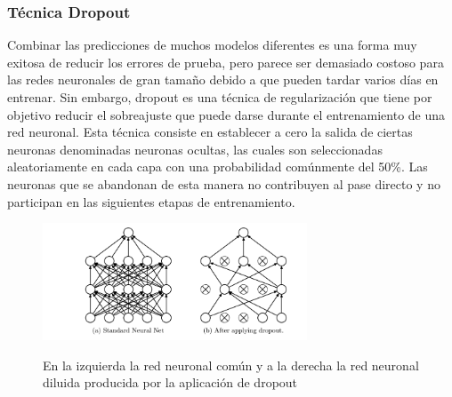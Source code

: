 		\vskip 0.4cm 
	\subsubsection {Técnica Dropout}
		
		Combinar las predicciones de muchos modelos diferentes es una forma muy exitosa de reducir los errores de prueba, pero parece ser demasiado costoso para las redes neuronales de gran tamaño debido a que pueden tardar varios días en entrenar. Sin embargo, dropout es una técnica de regularización que tiene por objetivo reducir el sobreajuste que puede darse durante el entrenamiento de una red neuronal. Esta técnica consiste en establecer a cero la salida de ciertas neuronas denominadas neuronas ocultas, las cuales son seleccionadas aleatoriamente en cada capa con una probabilidad comúnmente del 50\%. Las neuronas que se abandonan de esta manera no contribuyen al pase directo y no participan en las siguientes etapas de entrenamiento\citep{AulaDNN}.

		\begin{figure}[H]
		\begin{center}
		\includegraphics[width=0.7\textwidth]{images/marcoteorico/dropout_sample}
		\end{center}
		\begin{center}
		\caption{\small{En la izquierda la red neuronal común y a la derecha la red neuronal diluida producida por la aplicación de dropout}}
		{\small{\cite{AulaDNN}}}
		\end{center}
		\vspace{-1.5em}
		\end{figure}
		

